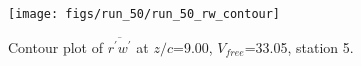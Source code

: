 \begin{figure}[H]
\centering
\texttt{[image: figs/run\_50/run\_50\_rw\_contour]}
\caption{Contour plot of $\overline{r^\prime w^\prime}$ at $z/c$=9.00, $V_{free}$=33.05, station 5.}
\end{figure}


